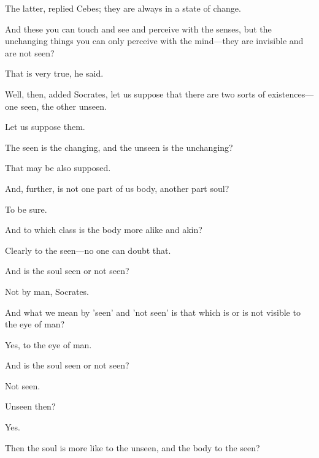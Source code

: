 \documentclass[11pt,letter]{article}
\begin{document}
\par  The latter, replied Cebes; they are always in a state of change.

\par  And these you can touch and see and perceive with the senses, but the unchanging things you can only perceive with the mind—they are invisible and are not seen?

\par  That is very true, he said.

\par  Well, then, added Socrates, let us suppose that there are two sorts of existences—one seen, the other unseen.

\par  Let us suppose them.

\par  The seen is the changing, and the unseen is the unchanging?

\par  That may be also supposed.

\par  And, further, is not one part of us body, another part soul?

\par  To be sure.

\par  And to which class is the body more alike and akin?

\par  Clearly to the seen—no one can doubt that.

\par  And is the soul seen or not seen?

\par  Not by man, Socrates.

\par  And what we mean by 'seen' and 'not seen' is that which is or is not visible to the eye of man?

\par  Yes, to the eye of man.

\par  And is the soul seen or not seen?

\par  Not seen.

\par  Unseen then?

\par  Yes.

\par  Then the soul is more like to the unseen, and the body to the seen?
\end{document}
